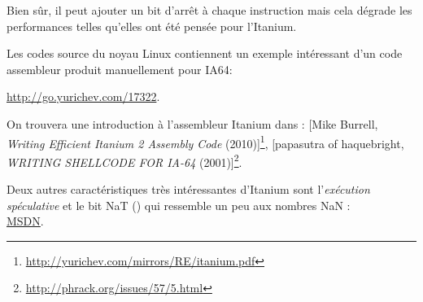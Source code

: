 Bien sûr, il peut ajouter un bit d'arrêt à chaque instruction mais cela dégrade les performances
telles qu'elles ont été pensée pour l'Itanium.

Les codes source du noyau Linux contiennent un exemple intéressant d'un code assembleur produit
manuellement pour \ac{IA64}:

\url{http://go.yurichev.com/17322}.

On trouvera une introduction à l'assembleur Itanium dans :
[Mike Burrell, \emph{Writing Efficient Itanium 2 Assembly Code} (2010)]\footnote{\AlsoAvailableAs \url{http://yurichev.com/mirrors/RE/itanium.pdf}},
[papasutra of haquebright, \emph{WRITING SHELLCODE FOR IA-64} (2001)]\footnote{\AlsoAvailableAs \url{http://phrack.org/issues/57/5.html}}.

Deux autres caractéristiques très intéressantes d'Itanium sont l'\emph{exécution spéculative}
et le bit NaT () qui ressemble un peu aux nombres \gls{NaN} : \\
\href{http://go.yurichev.com/17323}{MSDN}.

